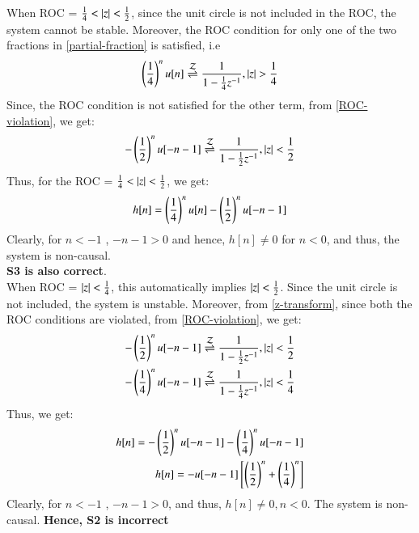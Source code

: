 \documentclass[journal,12pt,twocolumn]{IEEEtran}
\begin{document}
 When ROC = $\frac{1}{4} < \left\vert z\right\vert < \frac{1}{2}$, since the unit circle is not included in the ROC, the system cannot be stable. Moreover, the ROC condition for only one of the two fractions in \eqref{partial-fraction} is satisfied, i.e
 \begin{align}
     \left(\frac{1}{4}\right)^nu[n]\overset{\mathcal{Z}}{ \rightleftharpoons} \frac{1}{1 - \frac{1}{4}z^{-1}}  , \left\vert z\right\vert > \frac{1}{4}
 \end{align}
 Since, the ROC condition is not satisfied for the other term, from \eqref{ROC-violation}, we get:
 \begin{align}
    -\left(\frac{1}{2}\right)^nu[-n-1] \overset{\mathcal{Z}}{ \rightleftharpoons} \frac{1}{1 - \frac{1}{2}z^{-1}} , \left\vert z\right\vert < \frac{1}{2}
 \end{align}
 Thus, for the ROC = $\frac{1}{4} < \left\vert z\right\vert < \frac{1}{2}$, we get:
 \begin{align}
     h[n] = \left(\frac{1}{4}\right)^nu[n]  -\left(\frac{1}{2}\right)^{n} u[-n-1] 
 \end{align}
 Clearly, for $n<-1$ , $-n-1 > 0$ and hence, $h[n] \neq 0$ for $n<0$, and thus, the system is non-causal.\\
\textbf{ S3 is also correct}.\\

When ROC = $\left\vert z\right\vert < \frac{1}{4}$, this automatically implies $\left\vert z\right\vert < \frac{1}{2}$. Since the unit circle is not included, the system is unstable. Moreover, from \eqref{z-transform}, since both the ROC conditions are violated, from \eqref{ROC-violation}, we get:
\begin{align}
    -\left(\frac{1}{2}\right)^nu[-n-1] \overset{\mathcal{Z}}{ \rightleftharpoons} \frac{1}{1 - \frac{1}{2}z^{-1}} , \left\vert z\right\vert < \frac{1}{2}\\
    -\left(\frac{1}{4}\right)^nu[-n-1] \overset{\mathcal{Z}}{ \rightleftharpoons} \frac{1}{1 - \frac{1}{4}z^{-1}} , \left\vert z\right\vert < \frac{1}{4}
\end{align}
Thus, we get:
\begin{align}
    h[n] = -\left(\frac{1}{2}\right)^nu[-n-1] -\left(\frac{1}{4}\right)^nu[-n-1]\\
    h[n] = -u[-n-1]{}\left[\left(\frac{1}{2}\right)^n + \left(\frac{1}{4}\right)^n\right]
\end{align}
Clearly, for $n<-1$ , $-n-1 > 0$, and thus, $h[n] \neq 0 , n<0$. The system is non-causal.
\textbf{Hence, S2 is incorrect}\\
\end{document}

